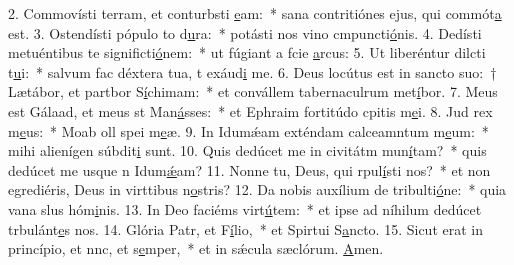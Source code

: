 2. Commovísti terram, et conturbsti \uline{e}am:~* sana contritiónes ejus, qui commót\uline{a} est.
3. Ostendísti pópulo to d\uline{u}ra:~* potásti nos vino cmpuncti\uline{ó}nis.
4. Dedísti metuéntibus te significti\uline{ó}nem:~* ut fúgiant a fcie \uline{a}rcus:
5. Ut liberéntur dilcti t\uline{u}i:~* salvum fac déxtera tua, t exáud\uline{i} me.
6. Deus locútus est in sancto suo:~† Lætábor, et partbor S\uline{í}chimam:~* et convállem tabernaculrum met\uline{í}bor.
7. Meus est Gálaad, et meus st Man\uline{á}sses:~* et Ephraim fortitúdo cpitis m\uline{e}i.
8. Jud rex m\uline{e}us:~* Moab oll spei m\uline{e}æ.
9. In Idumǽam exténdam calceamntum m\uline{e}um:~* mihi alienígen súbdit\uline{i} sunt.
10. Quis dedúcet me in civitátm mun\uline{í}tam?~* quis dedúcet me usque n Idum\uline{ǽ}am?
11. Nonne tu, Deus, qui rpul\uline{í}sti nos?~* et non egrediéris, Deus in virttibus n\uline{o}stris?
12. Da nobis auxílium de tribulti\uline{ó}ne:~* quia vana slus hóm\uline{i}nis.
13. In Deo faciéms virt\uline{ú}tem:~* et ipse ad níhilum dedúcet trbulánt\uline{e}s nos.
14. Glória Patr, et F\uline{í}lio,~* et Spirtui S\uline{a}ncto.
15. Sicut erat in princípio, et nnc, et s\uline{e}mper,~* et in sǽcula sæclórum. \uline{A}men.
